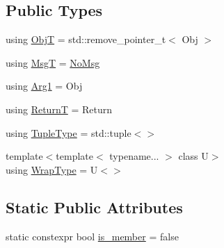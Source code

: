 \subsection*{Public Types}
\begin{DoxyCompactItemize}
\item 
using \hyperlink{structvt_1_1util_1_1fntraits_1_1detail_1_1_obj_func_traits_impl_3_01std_1_1enable__if__t_3_01not8a3cf894b8afc41bf28f29f3b0ac693f_ae2bf3b7ac64ebdf6acf2cbfdf4a7edd7}{ObjT} = std\+::remove\+\_\+pointer\+\_\+t$<$ Obj $>$
\item 
using \hyperlink{structvt_1_1util_1_1fntraits_1_1detail_1_1_obj_func_traits_impl_3_01std_1_1enable__if__t_3_01not8a3cf894b8afc41bf28f29f3b0ac693f_a16da9a9116724b05701dfd9b4d0075f3}{MsgT} = \hyperlink{structvt_1_1util_1_1fntraits_1_1detail_1_1_no_msg}{No\+Msg}
\item 
using \hyperlink{structvt_1_1util_1_1fntraits_1_1detail_1_1_obj_func_traits_impl_3_01std_1_1enable__if__t_3_01not8a3cf894b8afc41bf28f29f3b0ac693f_a993f20b53845642e3605ccd1dcc8cd21}{Arg1} = Obj
\item 
using \hyperlink{structvt_1_1util_1_1fntraits_1_1detail_1_1_obj_func_traits_impl_3_01std_1_1enable__if__t_3_01not8a3cf894b8afc41bf28f29f3b0ac693f_ae6ad5ba475ead2c5558dd406b5a383c7}{ReturnT} = Return
\item 
using \hyperlink{structvt_1_1util_1_1fntraits_1_1detail_1_1_obj_func_traits_impl_3_01std_1_1enable__if__t_3_01not8a3cf894b8afc41bf28f29f3b0ac693f_a784de26b85c99263380fbff7c4bb6d5d}{Tuple\+Type} = std\+::tuple$<$$>$
\item 
{\footnotesize template$<$template$<$ typename... $>$ class U$>$ }\\using \hyperlink{structvt_1_1util_1_1fntraits_1_1detail_1_1_obj_func_traits_impl_3_01std_1_1enable__if__t_3_01not8a3cf894b8afc41bf28f29f3b0ac693f_a8c54bb1de61b041a1d0c6c509b89d33c}{Wrap\+Type} = U$<$$>$
\end{DoxyCompactItemize}
\subsection*{Static Public Attributes}
\begin{DoxyCompactItemize}
\item 
static constexpr bool \hyperlink{structvt_1_1util_1_1fntraits_1_1detail_1_1_obj_func_traits_impl_3_01std_1_1enable__if__t_3_01not8a3cf894b8afc41bf28f29f3b0ac693f_ab01424c5b9d41c850071314653e219ac}{is\+\_\+member} = false
\end{DoxyCompactItemize}


